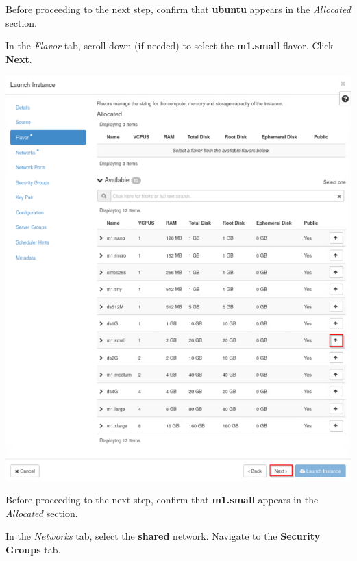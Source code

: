 \documentclass[letterpaper, 12pt]{article}
\begin{document}
\begin{enumerate}
    \begin{stopbox}
        Before proceeding to the next step, confirm that \textbf{ubuntu} appears in the \textit{Allocated} section.
    \end{stopbox}

    \begin{labstep}
        In the \textit{Flavor} tab, scroll down (if needed) to select the \textbf{m1.small} flavor.
        Click \textbf{Next}.

        \begin{center}
            \includegraphics[width=\linewidth]{images/part2/step13.png}
        \end{center}
    \end{labstep}

    \begin{stopbox}
        Before proceeding to the next step, confirm that \textbf{m1.small} appears in the \textit{Allocated} section.
    \end{stopbox}

    \begin{labstep}
        In the \textit{Networks} tab, select the \textbf{shared} network.
        Navigate to the \textbf{Security Groups} tab.


\end{labstep}
\end{enumerate}
\end{document}
